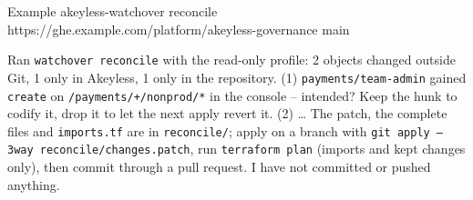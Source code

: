 \begin{session}{Example}
\you akeyless-watchover reconcile https://ghe.example.com/platform/akeyless-governance main

\agent Ran \texttt{watchover reconcile} with the read-only profile: 2 objects changed outside Git, 1 only in
Akeyless, 1 only in the repository. (1) \texttt{payments/team-admin} gained \texttt{create} on
\texttt{/payments/+/nonprod/*} in the console -- intended? Keep the hunk to codify it, drop it to let the next
apply revert it. (2) \ldots{} The patch, the complete files and \texttt{imports.tf} are in \texttt{reconcile/};
apply on a branch with \texttt{git apply --3way reconcile/changes.patch}, run \texttt{terraform plan} (imports
and kept changes only), then commit through a pull request. I have not committed or pushed anything.
\end{session}
